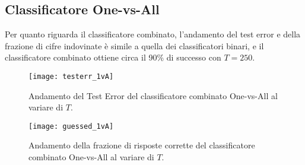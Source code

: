 \subsection{Classificatore One-vs-All}

Per quanto riguarda il classificatore combinato, l'andamento del test error e della frazione di cifre indovinate \`e simile a quella dei classificatori binari, e il classificatore combinato ottiene circa il 90\% di successo con \(T = 250\). 

\newpage
\thispagestyle{empty}

\begin{figure}[h]
\centering
\texttt{[image: testerr\_1vA]}
\caption{Andamento del Test Error del classificatore combinato One-vs-All al variare di $T$.}

\texttt{[image: guessed\_1vA]}
\caption{Andamento della frazione di risposte corrette del classificatore combinato One-vs-All al variare di $T$.}
\label{fig:1vA}
\end{figure}
